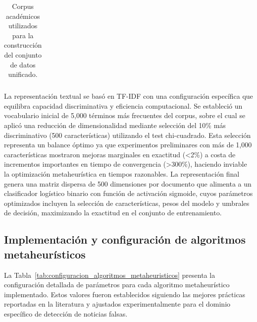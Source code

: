 \begin{table}[htbp]
{\begin{tabular}{|c|l|l|c|c|l|c|}
\hline
\end{tabular}
}
\caption{Corpus académicos utilizados para la construcción del conjunto de datos unificado.}
\label{tab:corpus_academicos_resultados}
\end{table}

La representación textual se basó en TF-IDF con una configuración específica que equilibra capacidad discriminativa y eficiencia computacional. Se estableció un vocabulario inicial de 5,000 términos más frecuentes del corpus, sobre el cual se aplicó una reducción de dimensionalidad mediante selección del 10\% más discriminativo (500 características) utilizando el test chi-cuadrado. Esta selección representa un balance óptimo ya que experimentos preliminares con más de 1,000 características mostraron mejoras marginales en exactitud (<2\%) a costa de incrementos importantes en tiempo de convergencia (>300\%), haciendo inviable la optimización metaheurística en tiempos razonables. La representación final genera una matriz dispersa de 500 dimensiones por documento que alimenta a un clasificador logístico binario con función de activación sigmoide, cuyos parámetros optimizados incluyen la selección de características, pesos del modelo y umbrales de decisión, maximizando la exactitud en el conjunto de entrenamiento.

\subsection{Implementación y configuración de algoritmos metaheurísticos}
\label{subsec:implementacion_algoritmos}

La Tabla~\ref{tab:configuracion_algoritmos_metaheuristicos} presenta la configuración detallada de parámetros para cada algoritmo metaheurístico implementado. Estos valores fueron establecidos siguiendo las mejores prácticas reportadas en la literatura y ajustados experimentalmente para el dominio específico de detección de noticias falsas.

